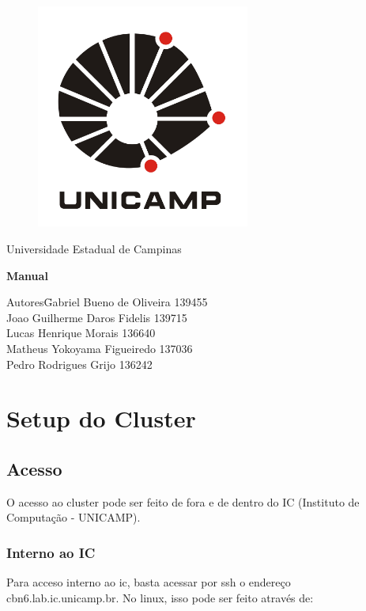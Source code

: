 \documentclass[a4paper,10pt]{article}
\date{\today}
\begin{document}
	\begin{titlepage}
		\begin{figure}
			\centering
			\includegraphics[width=7cm,keepaspectratio=true]{imagens/unicamp.png}
	
		\end{figure}
		\begin{center}
			\huge{Universidade Estadual de Campinas}
		
		\vfill
		\textbf{\LARGE{Manual}}
		\vfill
		\end{center}
		
		\begin{flushleft}
			\begin{tabbing}
				Autores\qquad\qquad\= Gabriel Bueno de Oliveira 139455 \\
					\>Joao Guilherme Daros Fidelis 139715 \\
					\>Lucas Henrique Morais 136640 \\
					\>Matheus Yokoyama Figueiredo 137036\\
					\>Pedro Rodrigues Grijo 136242\\
			\end{tabbing}
		\end{flushleft}
	\end{titlepage}

\newpage
\section{Setup do Cluster}
    \subsection{Acesso}
    O acesso ao cluster pode ser feito de fora e de dentro do IC (Instituto de Computação - UNICAMP).
        \subsubsection{Interno ao IC}
        Para acceso interno ao ic, basta acessar por ssh o endereço cbn6.lab.ic.unicamp.br. No linux, isso pode ser feito através de:
        
\end{document}
